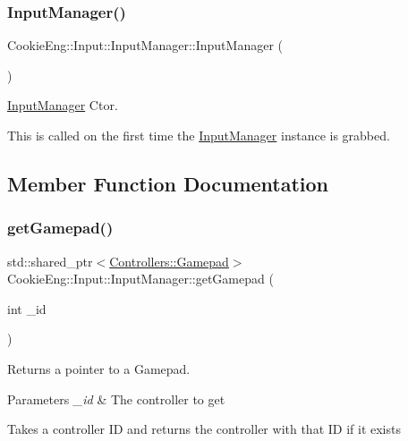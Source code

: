 \subsubsection{\texorpdfstring{Input\+Manager()}{InputManager()}}
{\footnotesize\ttfamily Cookie\+Eng\+::\+Input\+::\+Input\+Manager\+::\+Input\+Manager (\begin{DoxyParamCaption}{ }\end{DoxyParamCaption})\hspace{0.3cm}{\ttfamily [protected]}}



\hyperlink{class_cookie_eng_1_1_input_1_1_input_manager}{Input\+Manager} Ctor. 

This is called on the first time the \hyperlink{class_cookie_eng_1_1_input_1_1_input_manager}{Input\+Manager} instance is grabbed. 

\subsection{Member Function Documentation}
\mbox{\label{class_cookie_eng_1_1_input_1_1_input_manager_a0a5ffdaf3c5293f4c18f3808e46f5369}} 
\subsubsection{\texorpdfstring{get\+Gamepad()}{getGamepad()}}
{\footnotesize\ttfamily std\+::shared\+\_\+ptr$<$\hyperlink{class_cookie_eng_1_1_input_1_1_controllers_1_1_gamepad}{Controllers\+::\+Gamepad}$>$ Cookie\+Eng\+::\+Input\+::\+Input\+Manager\+::get\+Gamepad (\begin{DoxyParamCaption}\item[{int}]{\+\_\+id }\end{DoxyParamCaption})}



Returns a pointer to a Gamepad. 


\begin{DoxyParams}{Parameters}
{\em \+\_\+id} & The controller to get\\
\hline
\end{DoxyParams}
Takes a controller ID and returns the controller with that ID if it exists \mbox{\label{class_cookie_eng_1_1_input_1_1_input_manager_a0ae972a3fda8747b2b9cc6bb9417dfa8}} 
